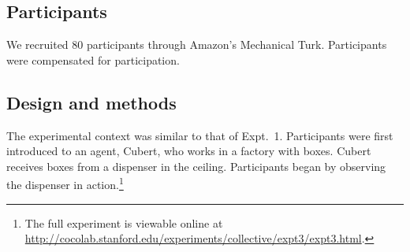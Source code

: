 \documentclass[preprint,12pt,authoryear,titlepage]{elsarticle}
\begin{document}
%
%
%


\subsection{Participants}

We recruited 80 participants through Amazon's Mechanical Turk. Participants were compensated for participation.

\subsection{Design and methods}

The experimental context was similar to that of Expt.~1. Participants were first introduced to an agent, Cubert, who works in a factory with boxes. Cubert receives boxes from a dispenser in the ceiling. Participants began by observing the dispenser in action.\footnote{The full experiment is viewable online at \url{http://cocolab.stanford.edu/experiments/collective/expt3/expt3.html}.} 
\end{document}
